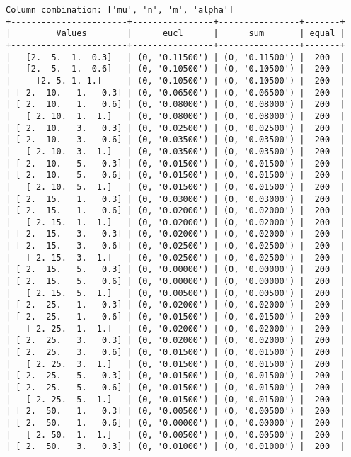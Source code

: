 \documentclass{article}
\begin{document}
\begin{verbatim}
Column combination: ['mu', 'n', 'm', 'alpha']
+-----------------------+----------------+----------------+-------+
|         Values        |      eucl      |      sum       | equal |
+-----------------------+----------------+----------------+-------+
|   [2.  5.  1.  0.3]   | (0, '0.11500') | (0, '0.11500') |  200  |
|   [2.  5.  1.  0.6]   | (0, '0.10500') | (0, '0.10500') |  200  |
|     [2. 5. 1. 1.]     | (0, '0.10500') | (0, '0.10500') |  200  |
| [ 2.  10.   1.   0.3] | (0, '0.06500') | (0, '0.06500') |  200  |
| [ 2.  10.   1.   0.6] | (0, '0.08000') | (0, '0.08000') |  200  |
|   [ 2. 10.  1.  1.]   | (0, '0.08000') | (0, '0.08000') |  200  |
| [ 2.  10.   3.   0.3] | (0, '0.02500') | (0, '0.02500') |  200  |
| [ 2.  10.   3.   0.6] | (0, '0.03500') | (0, '0.03500') |  200  |
|   [ 2. 10.  3.  1.]   | (0, '0.03500') | (0, '0.03500') |  200  |
| [ 2.  10.   5.   0.3] | (0, '0.01500') | (0, '0.01500') |  200  |
| [ 2.  10.   5.   0.6] | (0, '0.01500') | (0, '0.01500') |  200  |
|   [ 2. 10.  5.  1.]   | (0, '0.01500') | (0, '0.01500') |  200  |
| [ 2.  15.   1.   0.3] | (0, '0.03000') | (0, '0.03000') |  200  |
| [ 2.  15.   1.   0.6] | (0, '0.02000') | (0, '0.02000') |  200  |
|   [ 2. 15.  1.  1.]   | (0, '0.02000') | (0, '0.02000') |  200  |
| [ 2.  15.   3.   0.3] | (0, '0.02000') | (0, '0.02000') |  200  |
| [ 2.  15.   3.   0.6] | (0, '0.02500') | (0, '0.02500') |  200  |
|   [ 2. 15.  3.  1.]   | (0, '0.02500') | (0, '0.02500') |  200  |
| [ 2.  15.   5.   0.3] | (0, '0.00000') | (0, '0.00000') |  200  |
| [ 2.  15.   5.   0.6] | (0, '0.00000') | (0, '0.00000') |  200  |
|   [ 2. 15.  5.  1.]   | (0, '0.00500') | (0, '0.00500') |  200  |
| [ 2.  25.   1.   0.3] | (0, '0.02000') | (0, '0.02000') |  200  |
| [ 2.  25.   1.   0.6] | (0, '0.01500') | (0, '0.01500') |  200  |
|   [ 2. 25.  1.  1.]   | (0, '0.02000') | (0, '0.02000') |  200  |
| [ 2.  25.   3.   0.3] | (0, '0.02000') | (0, '0.02000') |  200  |
| [ 2.  25.   3.   0.6] | (0, '0.01500') | (0, '0.01500') |  200  |
|   [ 2. 25.  3.  1.]   | (0, '0.01500') | (0, '0.01500') |  200  |
| [ 2.  25.   5.   0.3] | (0, '0.01500') | (0, '0.01500') |  200  |
| [ 2.  25.   5.   0.6] | (0, '0.01500') | (0, '0.01500') |  200  |
|   [ 2. 25.  5.  1.]   | (0, '0.01500') | (0, '0.01500') |  200  |
| [ 2.  50.   1.   0.3] | (0, '0.00500') | (0, '0.00500') |  200  |
| [ 2.  50.   1.   0.6] | (0, '0.00000') | (0, '0.00000') |  200  |
|   [ 2. 50.  1.  1.]   | (0, '0.00500') | (0, '0.00500') |  200  |
| [ 2.  50.   3.   0.3] | (0, '0.01000') | (0, '0.01000') |  200  |

\end{verbatim}
\end{document}
